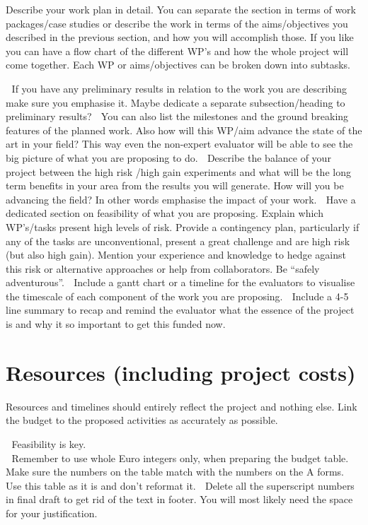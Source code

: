 \documentclass[oneside, a4paper, onecolumn, 11pt]{article}
\begin{document}
Describe your work plan in detail. You can separate the section in terms of work packages/case studies or describe the work in terms of the aims/objectives you described in the previous section, and how you will accomplish those. If you like you can have a flow chart of the different WP’s and how the whole project will come together. Each WP or aims/objectives can be broken down into subtasks.

 If you have any preliminary results in relation to the work you are describing make sure you emphasise it. Maybe dedicate a separate subsection/heading to preliminary results?
 You can also list the milestones and the ground breaking features of the planned work. Also how will this WP/aim advance the state of the art in your field? This way even the non-expert evaluator will be able to see the big picture of what you are proposing to do.
 Describe the balance of your project between the high risk /high gain experiments and what will be the long term benefits in your area from the results you will generate. How will you be advancing the field? In other words emphasise the impact of your work.
 Have a dedicated section on feasibility of what you are proposing. Explain which WP’s/tasks present high levels of risk. Provide a contingency plan, particularly if any of the tasks are unconventional, present a great challenge and are high risk (but also high gain). Mention your experience and knowledge to hedge against this risk or alternative approaches or help from collaborators. Be “safely adventurous”.
 Include a gantt chart or a timeline for the evaluators to visualise the timescale of each component of the work you are proposing.
 Include a 4-5 line summary to recap and remind the evaluator what the essence of the project is and why it so important to get this funded now.


\newpage
\section{Resources (including project costs)}
Resources and timelines should entirely reflect the project and nothing else. Link the budget to the proposed activities as accurately as possible.

 Feasibility is key.\\
 Remember to use whole Euro integers only, when preparing the budget table.
 Make sure the numbers on the table match with the numbers on the A forms.
 Use this table as it is and don’t reformat it.
 Delete all the superscript numbers in final draft to get rid of the text in footer. You will most likely
need the space for your justification.
\end{document}
